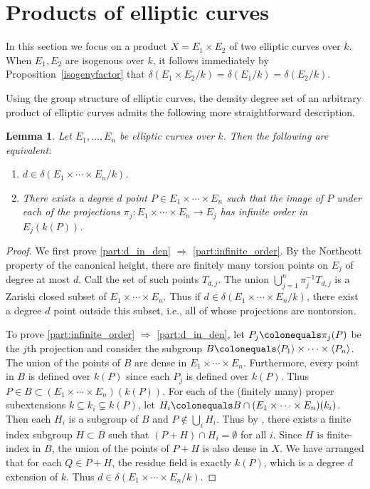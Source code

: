 \documentclass[a4paper,11pt]{amsart}
\theoremstyle{plain}
\newtheorem{lemma}[thm]{Lemma}
\theoremstyle{remark}
\newcommand{\dendegs}{\delta}
\begin{document}
\section{Products of elliptic curves}\label{sec:prodellcurves}
In this section we focus on a product $X=E_1\times E_2$ of two elliptic curves over $k$. When $E_1, E_2$ are isogenous over $k$, it follows immediately by Proposition~\ref{isogenyfactor} that $\dendegs(E_1\times E_2/k)=\dendegs(E_1/k)=\dendegs(E_2/k)$. 

Using the group structure of elliptic curves, the density degree set of an arbitrary product of elliptic curves admits the following more straightforward description.

\begin{lemma}\label{lem:deltaE}
    Let \(E_1, \dots, E_n\) be elliptic curves over \(k\).  Then the following are equivalent:
    \begin{enumerate}
        \item\label{part:d_in_den} \(d \in \dendegs(E_1 \times \cdots \times E_n/k)\). 
        \item\label{part:infinite_order} There exists a degree \(d\) point \(P \in E_1 \times \cdots \times E_n\) such that the image of \(P\) under each of the projections \(\pi_j \colon E _1 \times \cdots \times E_n \to E_j\) has infinite order in \(E_j(k(P))\).
    \end{enumerate}
\end{lemma}
\begin{proof}
We first prove \eqref{part:d_in_den} \(\Rightarrow\) \eqref{part:infinite_order}. By the Northcott property of the canonical height, there are finitely many torsion points on \(E_j\) of degree at most \(d\).  Call the set of such points \(T_{d, j}\).  The union \(\bigcup_{j=1}^n\pi_j^{-1} T_{d, j}\) is a Zariski closed subset of \(E_1 \times \cdots \times E_n\).
Thus if \(d \in \dendegs(E_1 \times \cdots \times E_n/k)\), there exist a degree \(d\) point outside this subset, i.e., all of whose projections are nontorsion.

To prove  \eqref{part:infinite_order} \(\Rightarrow\)  \eqref{part:d_in_den}, let \(P_j \colonequals \pi_j(P)\) be the \(j\)th projection and consider the subgroup \(B \colonequals \langle P_1\rangle \times \cdots \times \langle P_n \rangle\).  The union of the points of \(B\) are dense in \(E_1 \times \cdots \times E_n\).  Furthermore, every point in \(B\) is defined over \(k(P)\) since each \(P_j\) is defined over \(k(P)\).  Thus \(P \in B \subset (E_1 \times \cdots \times E_n)(k(P))\).  For each of the (finitely many) proper subextensions \(k \subseteq k_i \subsetneq k(P)\), let \(H_i \colonequals B \cap (E_1 \times \cdots \times E_n)(k_i)\).  Then each \(H_i\) is a subgroup of \(B\) and \(P \not\in \bigcup_i H_i\).  Thus by \cite[Lemma 4.3.8]{VV}, there exists a finite index subgroup \(H \subset B\) such that \((P + H)\cap H_i  = \emptyset\) for all \(i\).  Since \(H\) is finite-index in \(B\), the union of the points of \(P + H\) is also dense in \(X\).  We have arranged that for each \(Q \in P + H\), the residue field is exactly \(k(P)\), which is a degree \(d\) extension of \(k\).  Thus \(d \in \dendegs(E_1 \times \cdots \times E_n/k)\).
\end{proof}
\end{document}

